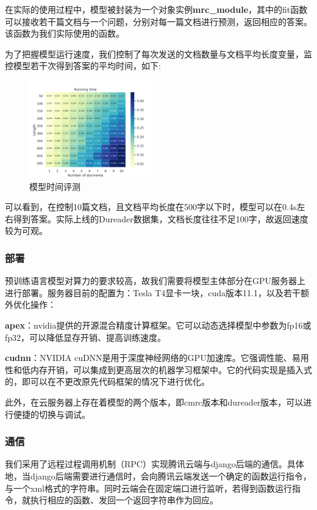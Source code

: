 \documentclass[12pt]{article}
\begin{document}
在实际的使用过程中，模型被封装为一个对象实例\textbf{mrc\_module}，其中的fit函数可以接收若干篇文档与一个问题，分别对每一篇文档进行预测，返回相应的答案。该函数为我们实际使用的函数。

为了把握模型运行速度，我们控制了每次发送的文档数量与文档平均长度变量，监控模型若干次得到答案的平均时间，如下:
\begin{figure}[H]  %
    \centering  %
    \includegraphics[width=0.5\textwidth]{fig/remote.png}
    \caption{模型时间评测}  %
\end{figure}
可以看到，在控制10篇文档，且文档平均长度在500字以下时，模型可以在0.4s左右得到答案。实际上线的Dureader数据集，文档长度往往不足100字，故返回速度较为可观。

\subsubsection{部署}
预训练语言模型对算力的要求较高，故我们需要将模型主体部分在GPU服务器上进行部署。服务器目前的配置为：Tesla T4显卡一块，cuda版本11.1，以及若干额外优化操作：

\textbf{apex}：nvidia提供的开源混合精度计算框架。它可以动态选择模型中参数为fp16或fp32，可以降低显存开销、提高训练速度。

\textbf{cudnn}：NVIDIA cuDNN是用于深度神经网络的GPU加速库。它强调性能、易用性和低内存开销，可以集成到更高层次的机器学习框架中。它的代码实现是插入式的，即可以在不更改原先代码框架的情况下进行优化。

此外，在云服务器上存在着模型的两个版本，即cmrc版本和dureader版本，可以进行便捷的切换与调试。

\subsubsection{通信}
我们采用了远程过程调用机制（RPC）实现腾讯云端与django后端的通信。具体地，当django后端需要进行通信时，会向腾讯云端发送一个确定的函数运行指令，与一个xml格式的字符串。同时云端会在固定端口进行监听，若得到函数运行指令，就执行相应的函数、发回一个返回字符串作为回应。
\end{document}

